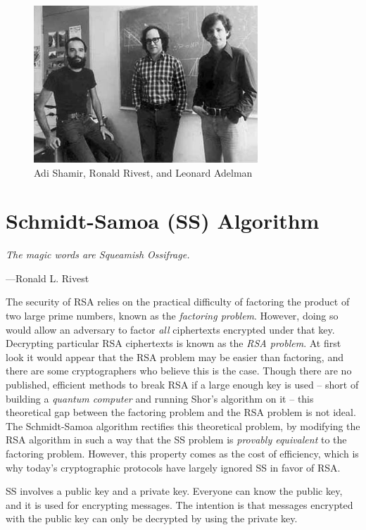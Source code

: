 
\begin{figure}[tbhp]
        \centering
\includegraphics[width=0.75\textwidth]{./images/rsa.jpeg}
        \caption{Adi Shamir, Ronald Rivest, and Leonard Adelman}\label{fig:rsa}
\end{figure}

\section{Schmidt-Samoa (SS) Algorithm}
\textwidth
\epigraph{\emph{The magic words are \emph{Squeamish Ossifrage}.}}{---Ronald L. Rivest}

\noindent
The security of RSA relies on the practical difficulty of
factoring the product of two large prime numbers, known as the
\emph{factoring problem}. However, doing so would allow an adversary
to factor \emph{all} ciphertexts encrypted under that key.
Decrypting particular RSA ciphertexts is known as the \emph{RSA problem}.
At first look it would appear that the RSA problem may be easier than factoring,
and there are some cryptographers who believe this is the case.
Though there are no published, efficient methods to break RSA if a large enough key
is used -- short of building a \emph{quantum computer} and running Shor's algorithm on it --
this theoretical gap between the factoring problem and the RSA problem is not ideal.
The Schmidt-Samoa algorithm rectifies this theoretical problem,
by modifying the RSA algorithm in such a way that the SS problem is \emph{provably equivalent}
to the factoring problem. However, this property comes as the cost of efficiency,
which is why today's cryptographic protocols have largely ignored SS in favor of RSA.

SS involves a public key and a private key. Everyone can know the
public key, and it is used for encrypting messages. The intention is
that messages encrypted with the public key can only be decrypted by
using the private key.

